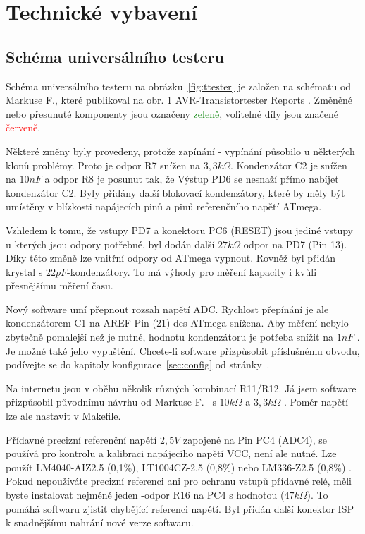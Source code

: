 \chapter{Technické vybavení}

\section{Schéma universálního testeru}
\label{sec:hardware}
Schéma universálního testeru na obrázku~\ref{fig:ttester} je založen na schématu od
Markuse F., které publikoval na obr. 1 AVR-Transistortester Reports \cite{Frejek}.
Změněné nebo přesunuté komponenty jsou označeny \textcolor{green}{zeleně}, volitelné díly jsou
značené \textcolor{red}{červeně}.

Některé změny byly provedeny, protože zapínání - vypínání působilo u některých klonů problémy.
Proto je odpor R7 snížen na \(3,3k\Omega\). 
Kondenzátor C2 je snížen na \(10nF\) a odpor R8 je posunut tak, že
Výstup PD6 se nesnaží přímo nabíjet kondenzátor C2.
Byly přidány další blokovací kondenzátory, které by měly být umístěny v blízkosti napájecích pinů
a pinů referenčního napětí ATmega.

Vzhledem k tomu, že vstupy PD7 a konektoru PC6 (RESET) jsou jediné vstupy u kterých
jsou   odpory potřebné, byl dodán další \(27k\Omega\)  odpor na PD7 (Pin 13).
Díky této změně lze vnitřní   odpory od ATmega vypnout.
Rovněž byl přidán krystal s \(22pF\)-kondenzátory.
To má výhody pro měření kapacity i kvůli přesnějšímu měření času.

Nový software umí přepnout rozsah napětí ADC. Rychlost přepínání je ale kondenzátorem C1
na AREF-Pin (21) des ATmega snížena.
Aby měření nebylo zbytečně pomalejší než je nutné, hodnotu kondenzátoru je potřeba snížit na \(1nF\) . 
Je možné také jeho vypuštění.
Chcete-li software přizpůsobit příslušnému obvodu, podívejte se do kapitoly
konfigurace~\ref{sec:config} od stránky~\pageref{sec:config}.
 
Na internetu jsou v oběhu několik různých kombinací R11/R12.
Já jsem software přizpůsobil původnímu návrhu od Markuse F.~\cite{Frejek} s \(10k\Omega\) a \(3,3k\Omega\) .
Poměr napětí lze ale nastavit v Makefile.

Přídavné precizní referenční napětí \(2,5V\) zapojené na Pin PC4 (ADC4),
se používá pro kontrolu a kalibraci napájecího napětí VCC, není ale nutné.
Lze použít LM4040-AIZ2.5 (0,1\%), LT1004CZ-2.5 (0,8\%) nebo LM336-Z2.5 (0,8\%) .
Pokud nepoužíváte precizní referenci ani pro ochranu vstupů přídavné relé,
měli byste instalovat nejméně jeden -odpor R16 na PC4 s hodnotou (\(47k\Omega\)).
To pomáhá softwaru zjistit chybějící referenci napětí.
Byl přidán další konektor ISP k snadnějšímu nahrání nové verze softwaru.

